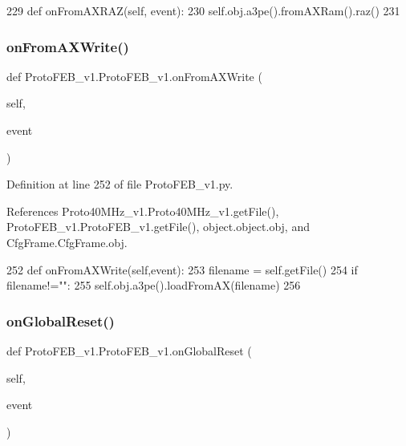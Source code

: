 \begin{DoxyCode}
229     \textcolor{keyword}{def }onFromAXRAZ(self, event):
230         self.obj.a3pe().fromAXRam().raz()
231 
\end{DoxyCode}
\mbox{\label{classProtoFEB__v1_1_1ProtoFEB__v1_a9bb0cbe720de19edf05beadcd7de581d}} 
\subsubsection{\texorpdfstring{on\+From\+A\+X\+Write()}{onFromAXWrite()}}
{\footnotesize\ttfamily def Proto\+F\+E\+B\+\_\+v1.\+Proto\+F\+E\+B\+\_\+v1.\+on\+From\+A\+X\+Write (\begin{DoxyParamCaption}\item[{}]{self,  }\item[{}]{event }\end{DoxyParamCaption})}



Definition at line 252 of file Proto\+F\+E\+B\+\_\+v1.\+py.



References Proto40\+M\+Hz\+\_\+v1.\+Proto40\+M\+Hz\+\_\+v1.\+get\+File(), Proto\+F\+E\+B\+\_\+v1.\+Proto\+F\+E\+B\+\_\+v1.\+get\+File(), object.\+object.\+obj, and Cfg\+Frame.\+Cfg\+Frame.\+obj.


\begin{DoxyCode}
252     \textcolor{keyword}{def }onFromAXWrite(self,event):
253         filename = self.getFile()
254         \textcolor{keywordflow}{if} filename!=\textcolor{stringliteral}{""}:
255             self.obj.a3pe().loadFromAX(filename)
256 
\end{DoxyCode}
\mbox{\label{classProtoFEB__v1_1_1ProtoFEB__v1_a37e3aa3b32821feafcf7f0a3f7edb930}} 
\subsubsection{\texorpdfstring{on\+Global\+Reset()}{onGlobalReset()}}
{\footnotesize\ttfamily def Proto\+F\+E\+B\+\_\+v1.\+Proto\+F\+E\+B\+\_\+v1.\+on\+Global\+Reset (\begin{DoxyParamCaption}\item[{}]{self,  }\item[{}]{event }\end{DoxyParamCaption})}



